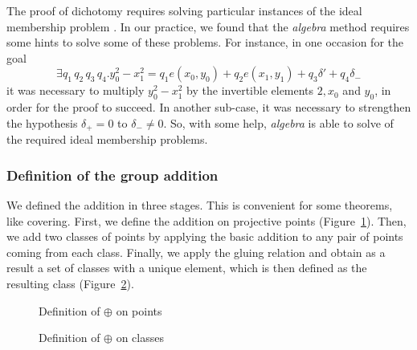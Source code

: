 \documentclass{llncs}
\begin{document}
The proof of dichotomy requires solving particular instances of the
ideal membership problem \cite{hales2016group}. In our practice, we
found that the \textit{algebra} method requires some hints to solve
some of these problems. For instance, in one occasion for the goal
\[
\exists q_1 \, q_2 \, q_3 \, q_4.
y_0^2 - x_1^2 = q_1 e(x_0,y_0) + q_2 e(x_1,y_1) + q_3 \delta' + q_4
\delta_{-} 
\] 
it was necessary to multiply $y_0^2 - x_1^2$ by the
invertible elements $2,x_0$ and $y_0$, in order for the proof to
succeed. In another sub-case, it was necessary to strengthen the
hypothesis $\delta_{+} = 0$ to $\delta_{-} \neq 0$. So, with some
help, \textit{algebra} is able to solve of the required ideal
membership problems.


\subsubsection{Definition of the group addition}

We defined the addition in three stages. This is convenient for some
theorems, like covering. First, we define the addition on projective
points (Figure~\ref{fig3}). Then, we add two classes of points by
applying the basic addition to any pair of points coming from each
class. Finally, we apply the gluing relation and obtain as a result a
set of classes with a unique element, which is then defined as the
resulting class (Figure~\ref{fig4}).



\begin{figure}
{}
\caption{Definition of $\oplus$ on points}
\label{fig3}
\end{figure}
\begin{figure}
	{}
	{}
	\caption{Definition of $\oplus$ on classes}
	\label{fig4}
\end{figure}

\end{document}
